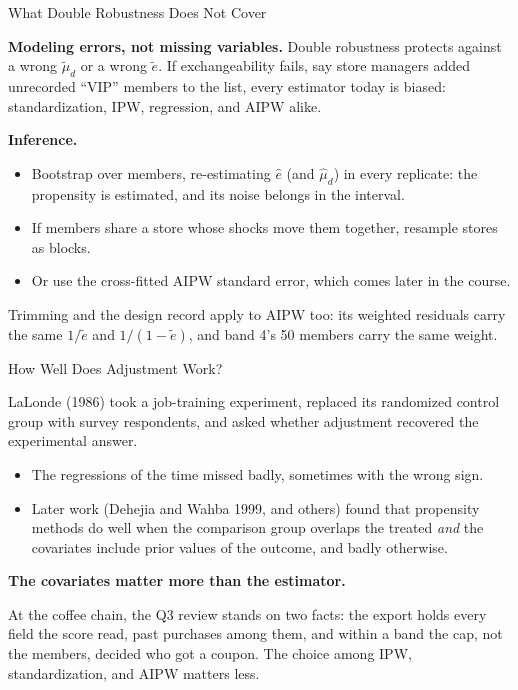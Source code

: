 \documentclass[aspectratio=169, 11pt, handout]{beamer}
\begin{document}
\begin{frame}{What Double Robustness Does Not Cover}

\textbf{Modeling errors, not missing variables.} Double robustness protects against a wrong $\tilde\mu_d$ or a wrong $\tilde e$. If exchangeability fails, say store managers added unrecorded ``VIP'' members to the list, every estimator today is biased: standardization, IPW, regression, and AIPW alike.

\bigskip

\textbf{Inference.}
\begin{itemize}
  \item Bootstrap over members, re-estimating $\hat e$ (and $\hat\mu_d$) in every replicate: the propensity is estimated, and its noise belongs in the interval.
  \item If members share a store whose shocks move them together, resample stores as blocks.
  \item Or use the cross-fitted AIPW standard error, which comes later in the course.
\end{itemize}

\bigskip

Trimming and the design record apply to AIPW too: its weighted residuals carry the same $1/\tilde e$ and $1/(1 - \tilde e)$, and band 4's 50 members carry the same weight.
\end{frame}

\begin{frame}{How Well Does Adjustment Work?}

LaLonde (1986) took a job-training experiment, replaced its randomized control group with survey respondents, and asked whether adjustment recovered the experimental answer.

\begin{itemize}
  \item The regressions of the time missed badly, sometimes with the wrong sign.
  \item Later work (Dehejia and Wahba 1999, and others) found that propensity methods do well when the comparison group overlaps the treated \emph{and} the covariates include prior values of the outcome, and badly otherwise.
\end{itemize}

\bigskip

\textbf{The covariates matter more than the estimator.}

\medskip

At the coffee chain, the Q3 review stands on two facts: the export holds every field the score read, past purchases among them, and within a band the cap, not the members, decided who got a coupon. The choice among IPW, standardization, and AIPW matters less.
\end{frame}
\end{document}
